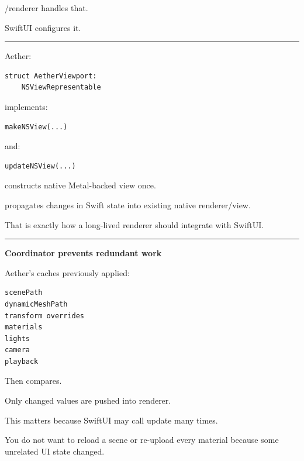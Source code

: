 /renderer handles that.

SwiftUI configures it.

\begin{center}\rule{0.5\linewidth}{0.5pt}\end{center}

\textbf{}

Aether:

\begin{verbatim}
struct AetherViewport:
    NSViewRepresentable
\end{verbatim}

implements:

\begin{verbatim}
makeNSView(...)
\end{verbatim}

and:

\begin{verbatim}
updateNSView(...)
\end{verbatim}

 constructs native Metal-backed view once.

 propagates changes in Swift state into existing native renderer/view.

That is exactly how a long-lived renderer should integrate with SwiftUI.

\begin{center}\rule{0.5\linewidth}{0.5pt}\end{center}

\textbf{Coordinator prevents redundant work}

Aether's  caches previously applied:

\begin{verbatim}
scenePath
dynamicMeshPath
transform overrides
materials
lights
camera
playback
\end{verbatim}

Then  compares.

Only changed values are pushed into renderer.

This matters because SwiftUI may call update many times.

You do not want to reload a scene or re-upload every material because some unrelated UI state changed.

